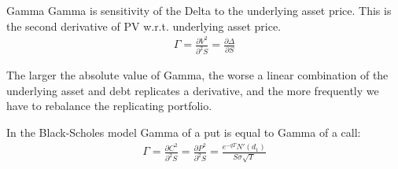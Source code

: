 \documentclass{beamer}
\begin{document}
\begin{frame}{Gamma}
\justify
\alert{Gamma} is sensitivity of the Delta to the underlying asset price. This is the second derivative of PV w.r.t. underlying asset price.
\begin{align*}
\Gamma = \frac{\partial V^2}{\partial^2 S} = \frac{\partial \Delta}{\partial S}
\end{align*}

\justify
The larger the absolute value of Gamma, the worse a linear combination of the underlying asset and debt replicates a derivative, and the more frequently we have to rebalance the replicating portfolio.

\justify
In the Black-Scholes model Gamma of a put is equal to Gamma of a call:
\begin{align*}
\Gamma = \frac{\partial C^2}{\partial^2 S} = \frac{\partial P^2}{\partial^2 S} =
\frac{e^{-qT}N'(d_1)}{S\sigma\sqrt{T}} 
\end{align*} 
\end{frame}
\end{document}

